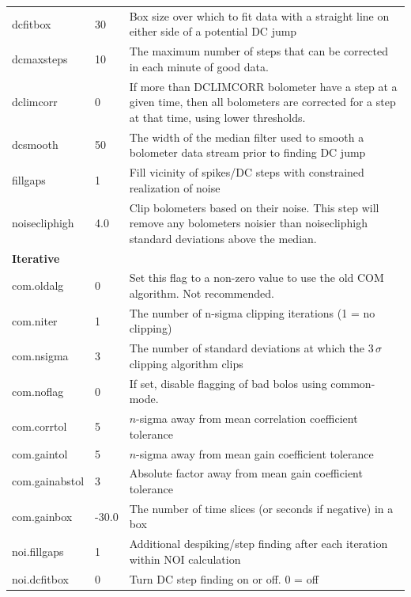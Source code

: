 \documentclass[twoside,11pt]{article}
\renewcommand{\_}{\texttt{\symbol{95}}}
\begin{document}
\begin{table}
\begin{center}
\begin{footnotesize}
\begin{tabular}{|p{2.2cm}|p{1.1cm}|p{11.4cm}|}
dcfitbox      &    30 & Box size over which to fit data with a straight
                        line on either side of a potential DC jump\\
dcmaxsteps    &    10 & The maximum number of steps that can be corrected
                        in each minute of good data.\\
dclimcorr     &     0 & If more than DCLIMCORR bolometer have a step at
                        a given time, then all bolometers are corrected for
                        a step at that time, using lower thresholds.\\
dcsmooth      &    50 & The width of the median filter used to smooth a
                        bolometer data stream prior to finding DC jump\\
fillgaps      &     1 & Fill vicinity of spikes/DC steps with constrained
                        realization of noise\\
noisecliphigh &   4.0 & Clip bolometers based on their noise. This step
                        will remove any bolometers noisier than noisecliphigh
                        standard deviations above the median.\\
\hline
\multicolumn{3}{|l|}{\textbf{Iterative}}\\
\hline
com.oldalg       &    0 & Set this flag to a non-zero value to use the old COM
                          algorithm. Not recommended.\\
com.niter        &    1 & The number of n-sigma clipping iterations (1 = no clipping)\\
com.nsigma       &    3 & The number of standard deviations at which the 3\,$\sigma$
                           clipping algorithm clips\\
com.noflag       &    0 & If set, disable flagging of bad bolos using common-mode.\\
com.corr\_tol    &    5 & $n$-sigma away from mean correlation coefficient tolerance\\
com.gain\_tol    &    5 & $n$-sigma away from mean gain coefficient tolerance\\
com.gain\_abstol &    3 & Absolute factor away from mean gain coefficient tolerance\\
com.gain\_box    &-30.0 & The number of time slices (or seconds if negative)
                          in a box\\
\hline
noi.fillgaps     &    1 & Additional despiking/step finding after each iteration within NOI calculation\\
noi.dcfitbox     &    0 & Turn DC step finding on or off. 0 = off\\

\end{tabular}
\end{footnotesize}
\end{center}
\end{table}
\end{document}
